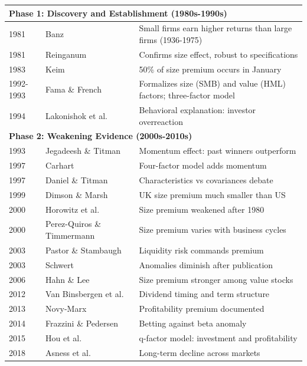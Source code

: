 \documentclass[10pt,letterpaper]{article}
\begin{document}
\begin{longtable}{p{2cm}p{3.5cm}p{6cm}}
\multicolumn{3}{l}{\textbf{Phase 1: Discovery and Establishment (1980s-1990s)}} \\
\hline
1981 & Banz~\cite{banz1981} & Small firms earn higher returns than large firms (1936-1975) \\
1981 & Reinganum~\cite{reinganum1981} & Confirms size effect, robust to specifications \\
1983 & Keim~\cite{keim1983} & 50\% of size premium occurs in January \\
1992-1993 & Fama \& French~\cite{fama1992,fama1993} & Formalizes size (SMB) and value (HML) factors; three-factor model \\
1994 & Lakonishok et al.~\cite{lakonishok1994} & Behavioral explanation: investor overreaction \\
\hline
\multicolumn{3}{l}{\textbf{Phase 2: Weakening Evidence (2000s-2010s)}} \\
\hline
1993 & Jegadeesh \& Titman~\cite{jegadeesh1993} & Momentum effect: past winners outperform \\
1997 & Carhart~\cite{carhart1997} & Four-factor model adds momentum \\
1997 & Daniel \& Titman~\cite{daniel1997} & Characteristics vs covariances debate \\
1999 & Dimson \& Marsh~\cite{dimson1999} & UK size premium much smaller than US \\
2000 & Horowitz et al.~\cite{horowitz2000} & Size premium weakened after 1980 \\
2000 & Perez-Quiros \& Timmermann~\cite{perez2000} & Size premium varies with business cycles \\
2003 & Pastor \& Stambaugh~\cite{pastor2003} & Liquidity risk commands premium \\
2003 & Schwert~\cite{schwert2003} & Anomalies diminish after publication \\
2006 & Hahn \& Lee~\cite{hahn2006} & Size premium stronger among value stocks \\
2012 & Van Binsbergen et al.~\cite{vanbinsbergen2012} & Dividend timing and term structure \\
2013 & Novy-Marx~\cite{novymarx2013} & Profitability premium documented \\
2014 & Frazzini \& Pedersen~\cite{frazzini2014} & Betting against beta anomaly \\
2015 & Hou et al.~\cite{hou2015} & q-factor model: investment and profitability \\
2018 & Asness et al.~\cite{asness2018} & Long-term decline across markets \\

\end{longtable}
\end{document}
